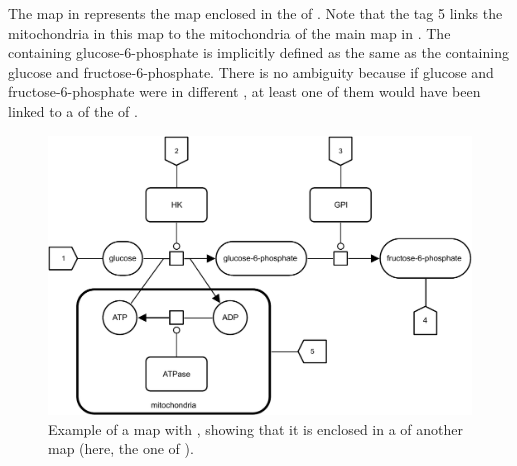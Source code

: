 The map in  represents the map enclosed in the  of .
Note that the tag 5 links the mitochondria  in this map to the mitochondria  of the main map in .
% 
The  containing glucose-6-phosphate is implicitly defined as the same as the  containing glucose and fructose-6-phosphate.
There is no ambiguity because if glucose and fructose-6-phosphate were in different , at least one of them would have been linked to a  of the  of .
% 


\begin{figure}
\begin{center}
\includegraphics[scale=0.8]{examples/submap-unfolded.pdf}
\caption{Example of a map with , showing that it is enclosed in a  of another map (here, the one of ).}
\label{fig:unfolded}
\end{center}
\end{figure}

%

